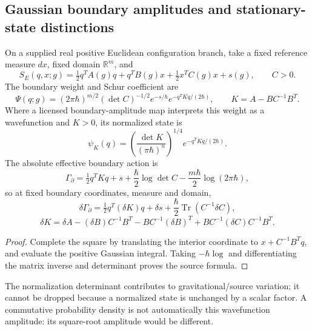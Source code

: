 \documentclass[12pt,a4paper]{article}
\begin{document}
\subsection{Gaussian boundary amplitudes and stationary-state distinctions}
\label{p4:app:v2109-gaussian-boundary}
\begin{theorem}
\label{p4:thm:v2109-gaussian-boundary-source}
On a supplied real positive Euclidean configuration branch, take a fixed
reference measure \(dx\), fixed domain \(\mathbb R^m\), and
\[
 S_E(q,x;g)=\tfrac12q^TA(g)q+q^TB(g)x+\tfrac12x^TC(g)x+s(g),
 \qquad C>0.
\]
The boundary weight and Schur coefficient are
\[
 \Psi(q;g)=(2\pi\hbar)^{m/2}(\det C)^{-1/2}e^{-s/\hbar}
 e^{-q^TKq/(2\hbar)},\qquad K=A-BC^{-1}B^T.
\]
Where a licensed boundary-amplitude map interprets this weight as a
wavefunction and \(K>0\), its normalized state is
\[
 \psi_K(q)=\left(\frac{\det K}{(\pi\hbar)^n}\right)^{1/4}
 e^{-q^TKq/(2\hbar)}.
\]
The absolute effective boundary action is
\[
 \Gamma_\partial=\tfrac12q^TKq+s+\frac\hbar2\log\det C
                  -\frac{m\hbar}{2}\log(2\pi\hbar),
\]
so at fixed boundary coordinates, measure and domain,
\[
 \delta\Gamma_\partial=\tfrac12q^T(\delta K)q+\delta s
 +\frac\hbar2\operatorname{Tr}(C^{-1}\delta C),
\]
\[
 \delta K=\delta A-(\delta B)C^{-1}B^T-BC^{-1}(\delta B)^T
            +BC^{-1}(\delta C)C^{-1}B^T.
\]
\end{theorem}
\begin{proof}
Complete the square by translating the interior coordinate to
\(x+C^{-1}B^Tq\), and evaluate the positive Gaussian integral.  Taking
\(-\hbar\log\) and differentiating the matrix inverse and determinant
proves the source formula.
\end{proof}
The normalization determinant contributes to gravitational/source variation;
it cannot be dropped because a normalized state is unchanged by a scalar
factor.  A commutative probability density is not automatically this
wavefunction amplitude: its square-root amplitude would be different.
\end{document}
